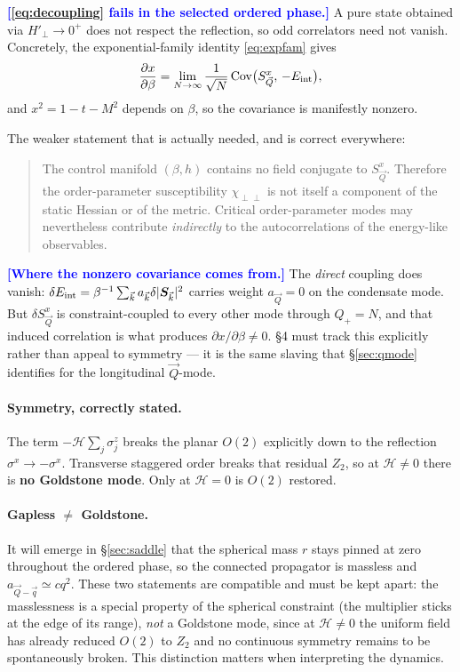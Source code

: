 \documentclass[11pt,a4paper]{article}
\newcommand{\Hc}{\mathcal{H}}
\newcommand{\bk}{\vec k}
\newcommand{\bQ}{\vec Q}
\newcommand{\bq}{\vec q}
\newcommand{\FLAG}[1]{\textcolor{blue}{\textbf{[#1]}}}
\newcommand{\Hc}{\mathcal{H}}          %
\newcommand{\bk}{\vec k}
\newcommand{\bQ}{\vec Q}
\newcommand{\bq}{\vec q}
\newcommand{\FLAG}[1]{\textcolor{blue}{\textbf{[#1]}}}
\begin{document}
\FLAG{\eqref{eq:decoupling} fails in the selected ordered phase.} A pure state obtained via
$H'_\perp\to0^+$ does not respect the reflection, so odd correlators need not vanish.
Concretely, the exponential-family identity \eqref{eq:expfam} gives
\begin{equation}
  \frac{\partial x}{\partial\beta}
  =\lim_{N\to\infty}\frac{1}{\sqrt N}\,\mathrm{Cov}\big(S^x_{\bQ},\,-E_{\rm int}\big),
\end{equation}
and $x^2=1-t-M^2$ depends on $\beta$, so the covariance is manifestly nonzero. %

The weaker statement that is actually needed, and is correct everywhere:
\begin{quote}
The control manifold $(\beta,h)$ contains no field conjugate to $S^x_{\bQ}$. Therefore the
order-parameter susceptibility $\chi_{\perp\perp}$ is not itself a component of the static
Hessian or of the metric. Critical order-parameter modes may nevertheless contribute
\emph{indirectly} to the autocorrelations of the energy-like observables.
\end{quote}

\FLAG{Where the nonzero covariance comes from.} The \emph{direct} coupling does vanish:
$\delta E_{\rm int}=\beta^{-1}\sum_{\bk}a_{\bk}\delta|\bm S_{\bk}|^2$ carries weight
$a_{\bQ}=0$ on the condensate mode. But $\delta S^x_{\bQ}$ is constraint-coupled to every
other mode through $Q_+=N$, and that induced correlation is what produces
$\partial x/\partial\beta\neq0$. \S4 must track this explicitly rather than appeal to
symmetry --- it is the same slaving that \S\ref{sec:qmode} identifies for the longitudinal
$\bQ$-mode.

\paragraph{Symmetry, correctly stated.} The term $-\Hc\sum_j\sigma^z_j$ breaks the planar
$O(2)$ explicitly down to the reflection $\sigma^x\to-\sigma^x$. Transverse staggered order
breaks that residual $Z_2$, so at $\Hc\neq0$ there is \textbf{no Goldstone mode}. Only at
$\Hc=0$ is $O(2)$ restored.

\paragraph{Gapless $\neq$ Goldstone.} It will emerge in \S\ref{sec:saddle} that the spherical
mass $r$ stays pinned at zero throughout the ordered phase, so the connected propagator is
massless and $a_{\bQ-\bq}\simeq cq^2$. These two statements are compatible and must be kept
apart: the masslessness is a special property of the spherical constraint (the multiplier
sticks at the edge of its range), \emph{not} a Goldstone mode, since at $\Hc\neq0$ the
uniform field has already reduced $O(2)$ to $Z_2$ and no continuous symmetry remains to be
spontaneously broken. This distinction matters when interpreting the dynamics.
\end{document}
